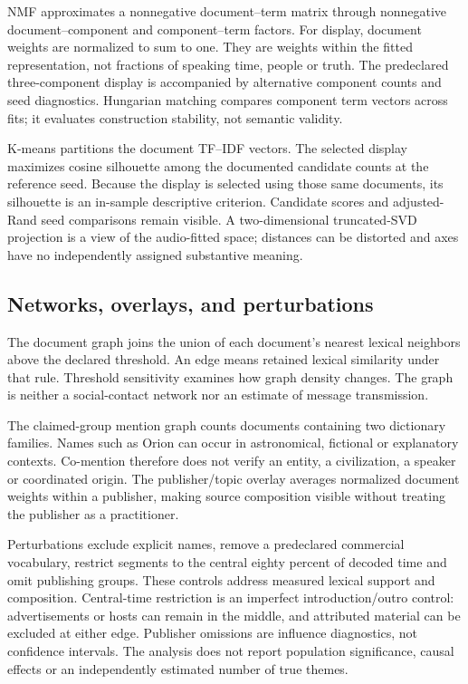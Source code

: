 NMF approximates a nonnegative document--term matrix through nonnegative document--component and component--term factors. For display, document weights are normalized to sum to one. They are weights within the fitted representation, not fractions of speaking time, people or truth. The predeclared three-component display is accompanied by alternative component counts and seed diagnostics. Hungarian matching compares component term vectors across fits; it evaluates construction stability, not semantic validity.

K-means partitions the document TF--IDF vectors. The selected display maximizes cosine silhouette among the documented candidate counts at the reference seed. Because the display is selected using those same documents, its silhouette is an in-sample descriptive criterion. Candidate scores and adjusted-Rand seed comparisons remain visible. A two-dimensional truncated-SVD projection is a view of the audio-fitted space; distances can be distorted and axes have no independently assigned substantive meaning.

\subsection{Networks, overlays, and perturbations}
The document graph joins the union of each document's nearest lexical neighbors above the declared threshold. An edge means retained lexical similarity under that rule. Threshold sensitivity examines how graph density changes. The graph is neither a social-contact network nor an estimate of message transmission.

The claimed-group mention graph counts documents containing two dictionary families. Names such as Orion can occur in astronomical, fictional or explanatory contexts. Co-mention therefore does not verify an entity, a civilization, a speaker or coordinated origin. The publisher/topic overlay averages normalized document weights within a publisher, making source composition visible without treating the publisher as a practitioner.

Perturbations exclude explicit names, remove a predeclared commercial vocabulary, restrict segments to the central eighty percent of decoded time and omit publishing groups. These controls address measured lexical support and composition. Central-time restriction is an imperfect introduction/outro control: advertisements or hosts can remain in the middle, and attributed material can be excluded at either edge. Publisher omissions are influence diagnostics, not confidence intervals. The analysis does not report population significance, causal effects or an independently estimated number of true themes.

